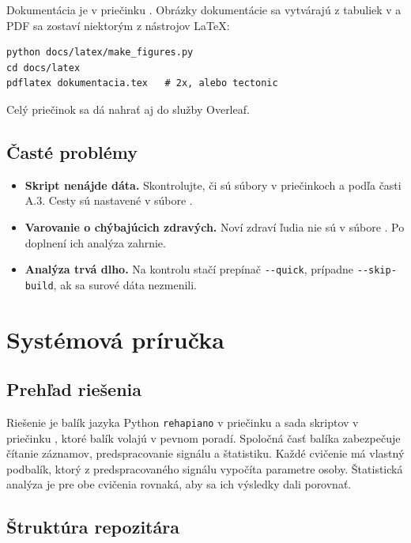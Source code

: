 \documentclass[12pt,a4paper]{article}
\begin{document}
Dokumentácia je v priečinku . Obrázky dokumentácie sa vytvárajú z tabuliek v
 a PDF sa zostaví niektorým z nástrojov LaTeX:
\begin{verbatim}
python docs/latex/make_figures.py
cd docs/latex
pdflatex dokumentacia.tex   # 2x, alebo tectonic
\end{verbatim}
Celý priečinok  sa dá nahrať aj do služby Overleaf.

\subsection{Časté problémy}

\begin{itemize}
  \item \textbf{Skript nenájde dáta.} Skontrolujte, či sú súbory v priečinkoch  a
         podľa časti A.3. Cesty sú nastavené v súbore .
  \item \textbf{Varovanie o chýbajúcich zdravých.} Noví zdraví ľudia nie sú v súbore
        . Po doplnení ich analýza zahrnie.
  \item \textbf{Analýza trvá dlho.} Na kontrolu stačí prepínač \texttt{-{}-quick}, prípadne \texttt{-{}-skip-build},
        ak sa surové dáta nezmenili.
\end{itemize}

\clearpage
\section{Systémová príručka}
\label{pril:b}

\subsection{Prehľad riešenia}

Riešenie je balík jazyka Python \texttt{rehapiano} v priečinku  a sada skriptov v priečinku
, ktoré balík volajú v pevnom poradí. Spoločná časť balíka zabezpečuje čítanie záznamov,
predspracovanie signálu a štatistiku. Každé cvičenie má vlastný podbalík, ktorý z predspracovaného signálu vypočíta
parametre osoby. Štatistická analýza je pre obe cvičenia rovnaká, aby sa ich výsledky dali porovnať.

\subsection{Štruktúra repozitára}
\end{document}
